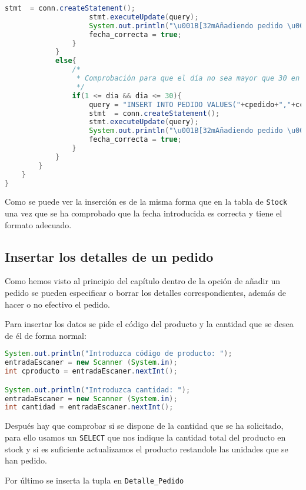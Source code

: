 \begin{lstlisting}[language=Java]
					stmt  = conn.createStatement();
					stmt.executeUpdate(query);
					System.out.println("\u001B[32mAñadiendo pedido \u001B[0m");
					fecha_correcta = true;
				}
			}
			else{
				/*
				 * Comprobación para que el día no sea mayor que 30 en los meses con ese número de días
				 */
				if(1 <= dia && dia <= 30){
					query = "INSERT INTO PEDIDO VALUES("+cpedido+","+ccliente + ",TO_DATE('"+fecha+"','YYYY-MM-DD'))";	
					stmt  = conn.createStatement();
					stmt.executeUpdate(query);
  					System.out.println("\u001B[32mAñadiendo pedido \u001B[0m");
  					fecha_correcta = true;
  				}
  			}
		}
	}
}	
\end{lstlisting}

Como se puede ver la inserción es de la misma forma que en la tabla de \texttt{Stock} una vez que se ha comprobado que la fecha introducida es correcta y tiene el formato adecuado.

\subsection{Insertar los detalles de un pedido}
Como hemos visto al principio del capítulo dentro de la opción de añadir un pedido se pueden especificar o borrar los detalles correspondientes, además de hacer o no efectivo el pedido.

Para insertar los datos se pide el código del producto y la cantidad que se desea de él de forma normal:

\begin{lstlisting}[language=Java]
System.out.println("Introduzca código de producto: ");
entradaEscaner = new Scanner (System.in);
int cproducto = entradaEscaner.nextInt();

System.out.println("Introduzca cantidad: ");
entradaEscaner = new Scanner (System.in);
int cantidad = entradaEscaner.nextInt();

\end{lstlisting}

Después hay que comprobar si se dispone de la cantidad que se ha solicitado, para ello usamos un \texttt{SELECT} que nos indique la cantidad total del producto en stock y si es suficiente actualizamos el producto restandole las unidades que se han pedido.

Por último se inserta la tupla en \texttt{Detalle\_Pedido}

